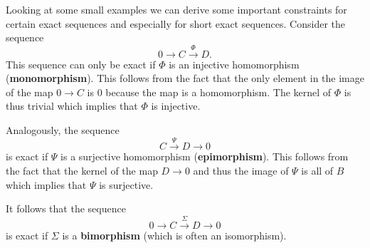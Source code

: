 

	\begin{property}
		Looking at some small examples we can derive some important constraints for certain exact sequences and especially for short exact sequences. Consider the sequence \[0\longrightarrow C\overset{\Phi}{\longrightarrow}D.\] This sequence can only be exact if $\Phi$ is an injective homomorphism (\textbf{monomorphism}). This follows from the fact that the only element in the image of the map $0\rightarrow C$ is 0 because the map is a homomorphism. The kernel of $\Phi$ is thus trivial which implies that $\Phi$ is injective.

		Analogously, the sequence \[C\overset{\Psi}{\longrightarrow}D\longrightarrow0\] is exact if $\Psi$ is a surjective homomorphism (\textbf{epimorphism}). This follows from the fact that the kernel of the map $D\rightarrow0$ and thus the image of $\Psi$ is all of $B$ which implies that $\Psi$ is surjective.

		It follows that the sequence \[0\longrightarrow C\overset{\Sigma}{\longrightarrow}D\longrightarrow0\] is exact if $\Sigma$ is a \textbf{bimorphism} (which is often an isomorphism).
	\end{property}

